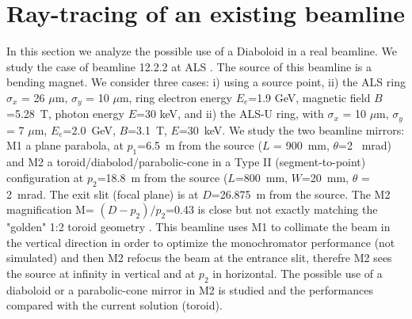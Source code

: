 \documentclass{iucr}              %
\begin{document}
\section{Ray-tracing of an existing beamline}
\label{sec:beamline}

In this section we analyze the possible use of a Diaboloid in a real beamline. We study the case of beamline 12.2.2  at ALS \cite{bl1222} \cite{MacDowell2004}. The source of this beamline is a bending magnet. We consider three cases: i) using a source point, ii) the ALS ring
$\sigma_x$ = 26 $\mu$m, $\sigma_y$ = 10 $\mu$m, ring electron energy $E_e$=1.9 GeV, magnetic field $B$=5.28~T, photon energy $E$=30 keV, and ii) the ALS-U ring, with $\sigma_x$ = 10 $\mu$m, $\sigma_y$ = 7 $\mu$m, $E_e$=2.0~GeV, $B$=3.1~T, $E$=30~keV. We study the two beamline mirrors: M1 a plane parabola, at $p_1$=6.5~m from the source ($L$ = 900~mm, $\theta$=2 ~mrad) and M2 a toroid/diabolod/parabolic-cone in a Type II (segment-to-point) configuration at $p_2$=18.8~m from the source ($L$=800~mm, $W$=20~mm, $\theta$ = 2~mrad. The exit slit (focal plane) is at $D$=26.875~m from the source.  The M2 magnification M= $(D-p_2)/p_2$=0.43 is close but not exactly matching the "golden" 1:2 toroid geometry \cite{padmore2000, howells2000}. This beamline uses M1 to collimate the beam in the vertical direction in order to optimize the monochromator performance (not simulated) and then M2 refocus the beam at the entrance slit, therefre M2 sees the source at infinity in vertical and at $p_2$ in horizontal. The possible use of a diaboloid or a parabolic-cone mirror in M2 is studied and the performances compared with the current solution (toroid).
\end{document}
